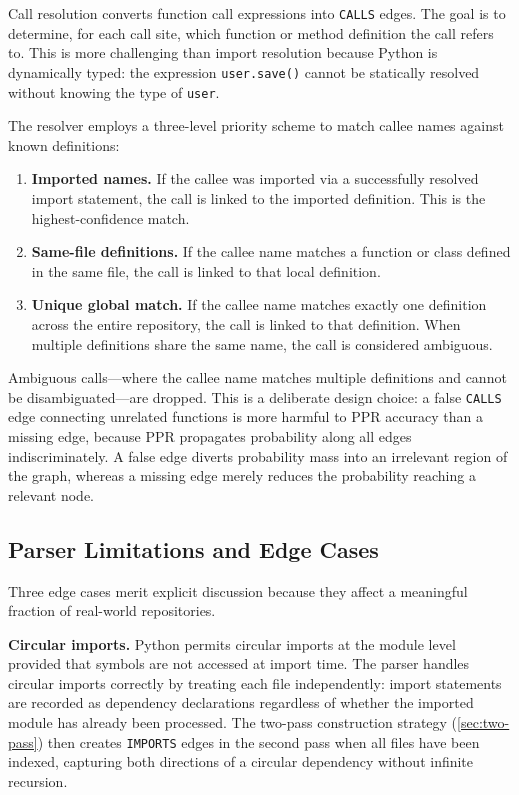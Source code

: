 Call resolution converts function call expressions into \texttt{CALLS} edges. The goal is to determine, for each call site, which function or method definition the call refers to. This is more challenging than import resolution because Python is dynamically typed: the expression \texttt{user.save()} cannot be statically resolved without knowing the type of \texttt{user}.

The resolver employs a three-level priority scheme to match callee names against known definitions:

\begin{enumerate}[leftmargin=*, itemsep=4pt]
    \item \textbf{Imported names.} If the callee was imported via a successfully resolved import statement, the call is linked to the imported definition. This is the highest-confidence match.
    \item \textbf{Same-file definitions.} If the callee name matches a function or class defined in the same file, the call is linked to that local definition.
    \item \textbf{Unique global match.} If the callee name matches exactly one definition across the entire repository, the call is linked to that definition. When multiple definitions share the same name, the call is considered ambiguous.
\end{enumerate}

Ambiguous calls---where the callee name matches multiple definitions and cannot be disambiguated---are dropped. This is a deliberate design choice: a false \texttt{CALLS} edge connecting unrelated functions is more harmful to PPR accuracy than a missing edge, because PPR propagates probability along all edges indiscriminately. A false edge diverts probability mass into an irrelevant region of the graph, whereas a missing edge merely reduces the probability reaching a relevant node.

\subsection{Parser Limitations and Edge Cases}
\label{sec:parser-limitations}

Three edge cases merit explicit discussion because they affect a meaningful fraction of real-world repositories.

\textbf{Circular imports.} Python permits circular imports at the module level provided that symbols are not accessed at import time. The parser handles circular imports correctly by treating each file independently: import statements are recorded as dependency declarations regardless of whether the imported module has already been processed. The two-pass construction strategy (\cref{sec:two-pass}) then creates \texttt{IMPORTS} edges in the second pass when all files have been indexed, capturing both directions of a circular dependency without infinite recursion.


